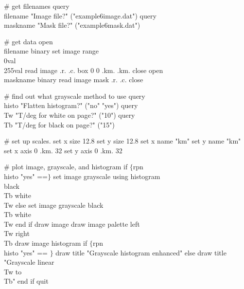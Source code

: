 \# get filenames
query \\filename "Image file?" ("example6image.dat")
query \\maskname "Mask  file?" ("example6mask.dat")

\# get data
open \\filename binary
set image range \\0val \\255val
read image .r. .c. box 0 0 .km. .km.
close
open \\maskname binary
read image mask .r. .c.
close

\# find out what grayscale method to use
query \\histo "Flatten histogram?"       ("no" "yes")
query \\Tw    "T/deg for white on page?" ("10")
query \\Tb    "T/deg for black on page?" ("15")

\# set up scales. 
set x size 12.8
set y size 12.8
set x name "km"
set y name "km"
set x axis 0 .km. 32
set y axis 0 .km. 32

\# plot image, grayscale, and histogram
if $\lbrace$rpn \\histo "yes" ==$\rbrace$
    set image grayscale using histogram \\
        black \\Tb white \\Tw
else
    set image grayscale black \\Tb white \\Tw
end if
draw image
draw image palette left \\Tw right \\Tb
draw image histogram
if $\lbrace$rpn \\histo "yes" == $\rbrace$
    draw title "Grayscale histogram enhanced"
else
    draw title "Grayscale linear \\Tw to \\Tb"
end if
quit
\endexample


\notice

\bye
